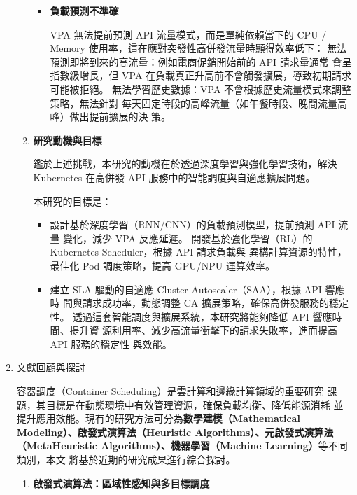 \documentclass[12pt,a4paper]{article}
\begin{document}
\begin{enumerate}[label={(\zhdig*)}, leftmargin=2\parindent, listparindent=\parindent]
\begin{enumerate}[label={(\arabic*)}, leftmargin=\parindent, listparindent=\parindent]
\begin{itemize}[leftmargin=\parindent, listparindent=\parindent]
    \item \textbf{
負載預測不準確
}

VPA 無法提前預測 API 流量模式，而是單純依賴當下的 CPU /
Memory 使用率，這在應對突發性高併發流量時顯得效率低下：
無法預測即將到來的高流量：例如電商促銷開始前的 API 請求量通常
會呈指數級增長，但 VPA 在負載真正升高前不會觸發擴展，導致初期請求
可能被拒絕。
無法學習歷史數據：VPA 不會根據歷史流量模式來調整策略，無法針對
每天固定時段的高峰流量（如午餐時段、晚間流量高峰）做出提前擴展的決
策。

    \end{itemize}
    \item \textbf{研究動機與目標}

鑑於上述挑戰，本研究的動機在於透過深度學習與強化學習技術，解決
Kubernetes 在高併發 API 服務中的智能調度與自適應擴展問題。

本研究的目標是：
\begin{itemize}[leftmargin=\parindent, listparindent=\parindent]

    \item 設計基於深度學習（RNN/CNN）的負載預測模型，提前預測 API 流量
變化，減少 VPA 反應延遲。
開發基於強化學習（RL）的 Kubernetes Scheduler，根據 API 請求負載與
異構計算資源的特性，最佳化 Pod 調度策略，提高 GPU/NPU 運算效率。

    \item 建立 SLA 驅動的自適應 Cluster Autoscaler（SAA），根據 API 響應時
間與請求成功率，動態調整 CA 擴展策略，確保高併發服務的穩定性。
透過這套智能調度與擴展系統，本研究將能夠降低 API 響應時間、提升資
源利用率、減少高流量衝擊下的請求失敗率，進而提高 API 服務的穩定性
與效能。
\end{itemize}

\end{enumerate}
\item 文獻回顧與探討

容器調度（Container Scheduling）是雲計算和邊緣計算領域的重要研究
課題，其目標是在動態環境中有效管理資源，確保負載均衡、降低能源消耗
並提升應用效能。現有的研究方法可分為\textbf{數學建模（Mathematical
Modeling）、啟發式演算法（Heuristic Algorithms）、元啟發式演算法（MetaHeuristic Algorithms）、機器學習（Machine Learning）}等不同類別，本文
將基於近期的研究成果進行綜合探討。
\begin{enumerate}[label={(\arabic*)}, leftmargin=\parindent, listparindent=\parindent]

    \item \textbf{
啟發式演算法：區域性感知與多目標調度}


\end{enumerate}
\end{enumerate}
\end{document}
